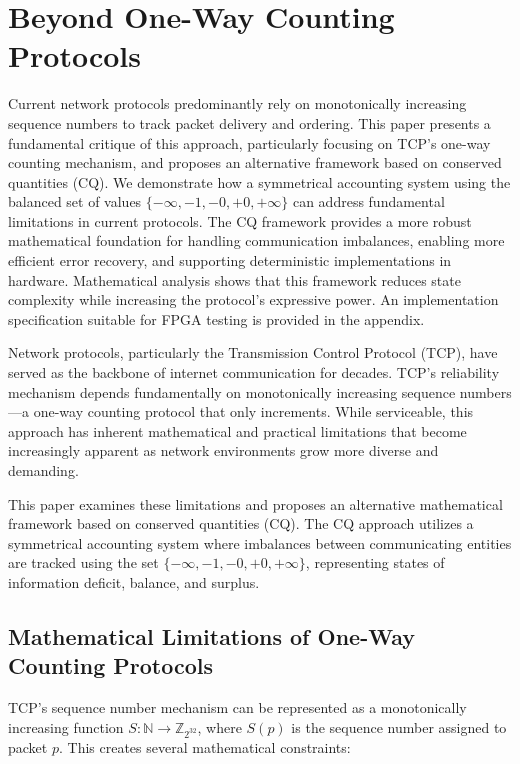 \documentclass[../../../OAE-SPEC-MAIN.tex]{subfiles}
\begin{document}
\section{Beyond One-Way Counting Protocols}
Current network protocols predominantly rely on monotonically increasing sequence numbers to track packet delivery and ordering. This paper presents a fundamental critique of this approach, particularly focusing on TCP's one-way counting mechanism, and proposes an alternative framework based on conserved quantities (CQ). We demonstrate how a symmetrical accounting system using the balanced set of values $\{-\infty, -1, -0, +0, +\infty\}$ can address fundamental limitations in current protocols. The CQ framework provides a more robust mathematical foundation for handling communication imbalances, enabling more efficient error recovery, and supporting deterministic implementations in hardware. Mathematical analysis shows that this framework reduces state complexity while increasing the protocol's expressive power. An implementation specification suitable for FPGA testing is provided in the appendix.

Network protocols, particularly the Transmission Control Protocol (TCP), have served as the backbone of internet communication for decades. TCP's reliability mechanism depends fundamentally on monotonically increasing sequence numbers—a one-way counting protocol that only increments. While serviceable, this approach has inherent mathematical and practical limitations that become increasingly apparent as network environments grow more diverse and demanding.

This paper examines these limitations and proposes an alternative mathematical framework based on conserved quantities (CQ). The CQ approach utilizes a symmetrical accounting system where imbalances between communicating entities are tracked using the set $\{-\infty, -1, -0, +0, +\infty\}$, representing states of information deficit, balance, and surplus.

\subsection{Mathematical Limitations of One-Way Counting Protocols}

TCP's sequence number mechanism can be represented as a monotonically increasing function $S: \mathbb{N} \rightarrow \mathbb{Z}_{2^{32}}$, where $S(p)$ is the sequence number assigned to packet $p$. This creates several mathematical constraints:
\end{document}
